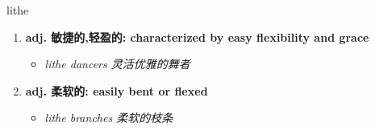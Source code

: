 
\begin{frame}
{\huge lithe}
\begin{center}
\begin{enumerate}\Large
  \item \textbf{adj. 敏捷的,轻盈的: characterized by easy flexibility and grace}
  \begin{itemize}
    \item \em{\Large{lithe dancers 灵活优雅的舞者}}
  \end{itemize}
  \item \textbf{adj. 柔软的: easily bent or flexed}
  \begin{itemize}
    \item \em{\Large{lithe branches 柔软的枝条}}
  \end{itemize}
\end{enumerate}
\end{center}
\end{frame}
